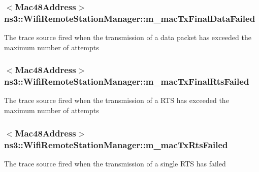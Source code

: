 \subsubsection[{\texorpdfstring{m\+\_\+mac\+Tx\+Final\+Data\+Failed}{m_macTxFinalDataFailed}}]{$<${\bf Mac48\+Address}$>$ ns3\+::\+Wifi\+Remote\+Station\+Manager\+::m\+\_\+mac\+Tx\+Final\+Data\+Failed\hspace{0.3cm}{\ttfamily [private]}}\hypertarget{classns3_1_1WifiRemoteStationManager_afc5bf08a7fbfd3e42a7fdd4d8ac5e966}{}\label{classns3_1_1WifiRemoteStationManager_afc5bf08a7fbfd3e42a7fdd4d8ac5e966}
The trace source fired when the transmission of a data packet has exceeded the maximum number of attempts 
\subsubsection[{\texorpdfstring{m\+\_\+mac\+Tx\+Final\+Rts\+Failed}{m_macTxFinalRtsFailed}}]{$<${\bf Mac48\+Address}$>$ ns3\+::\+Wifi\+Remote\+Station\+Manager\+::m\+\_\+mac\+Tx\+Final\+Rts\+Failed\hspace{0.3cm}{\ttfamily [private]}}\hypertarget{classns3_1_1WifiRemoteStationManager_a5a826567a9ee581c77563479a6dffc53}{}\label{classns3_1_1WifiRemoteStationManager_a5a826567a9ee581c77563479a6dffc53}
The trace source fired when the transmission of a R\+TS has exceeded the maximum number of attempts 
\subsubsection[{\texorpdfstring{m\+\_\+mac\+Tx\+Rts\+Failed}{m_macTxRtsFailed}}]{$<${\bf Mac48\+Address}$>$ ns3\+::\+Wifi\+Remote\+Station\+Manager\+::m\+\_\+mac\+Tx\+Rts\+Failed\hspace{0.3cm}{\ttfamily [private]}}\hypertarget{classns3_1_1WifiRemoteStationManager_a28c2c1347d68cd0e3e913fbef1daa00e}{}\label{classns3_1_1WifiRemoteStationManager_a28c2c1347d68cd0e3e913fbef1daa00e}
The trace source fired when the transmission of a single R\+TS has failed 
